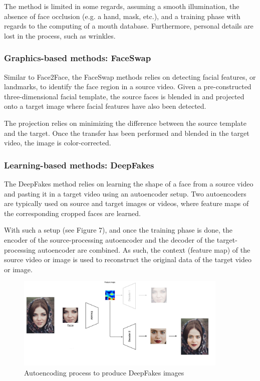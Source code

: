 \documentclass{article} %
\begin{document}
The method is limited in some regards, assuming a smooth illumination, the absence of face occlusion (e.g. a hand, mask, etc.), and a training phase with regards to the computing of a mouth database. Furthermore, personal details are lost in the process, such as wrinkles.

\subsubsection{Graphics-based methods: FaceSwap}

Similar to Face2Face, the FaceSwap methods relies on detecting facial features, or landmarks, to identify the face region in a source video. Given a pre-constructed three-dimensional facial template, the source faces is blended in and projected onto a target image where facial features have also been detected. 

The projection relies on minimizing the difference between the source template and the target. Once the transfer has been performed and blended in the target video, the image is color-corrected.

\subsubsection{Learning-based methods: DeepFakes}

The DeepFakes method relies on learning the shape of a face from a source video and pasting it in a target video using an autoencoder setup. Two autoencoders are typically used on source and target images or videos, where feature maps of the corresponding cropped faces are learned. 


With such a setup (see Figure 7), and once the training phase is done, the encoder of the source-processing autoencoder and the decoder of the target-processing autoencoder are combined. As such, the context (feature map) of the source video or image is used to reconstruct the original data of the target video or image.

\begin{figure}[H]
\begin{center}
\includegraphics[width=0.9\textwidth]{images/deepfake.jpeg}
\end{center}
\caption{Autoencoding process to produce DeepFakes images \citep{hui}}
\end{figure}
\end{document}
